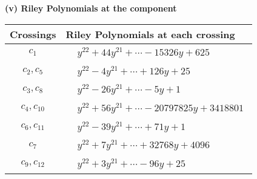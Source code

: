 \documentclass[1p]{elsarticle_modified}
\theoremstyle{definition}
\begin{document}
\flushleft \textbf{(v) Riley Polynomials at the component}\newline \\
\begin{tabular}{m{50pt}|m{274pt}}
Crossings & \hspace{64pt}Riley Polynomials at each crossing \\
\hline $$\begin{aligned}c_{1}\end{aligned}$$&$\begin{aligned}
&y^{22}+44 y^{21}+\cdots-15326 y+625
\end{aligned}$\\
\hline $$\begin{aligned}c_{2},c_{5}\end{aligned}$$&$\begin{aligned}
&y^{22}-4 y^{21}+\cdots+126 y+25
\end{aligned}$\\
\hline $$\begin{aligned}c_{3},c_{8}\end{aligned}$$&$\begin{aligned}
&y^{22}-26 y^{21}+\cdots-5 y+1
\end{aligned}$\\
\hline $$\begin{aligned}c_{4},c_{10}\end{aligned}$$&$\begin{aligned}
&y^{22}+56 y^{21}+\cdots-20797825 y+3418801
\end{aligned}$\\
\hline $$\begin{aligned}c_{6},c_{11}\end{aligned}$$&$\begin{aligned}
&y^{22}-39 y^{21}+\cdots+71 y+1
\end{aligned}$\\
\hline $$\begin{aligned}c_{7}\end{aligned}$$&$\begin{aligned}
&y^{22}+7 y^{21}+\cdots+32768 y+4096
\end{aligned}$\\
\hline $$\begin{aligned}c_{9},c_{12}\end{aligned}$$&$\begin{aligned}
&y^{22}+3 y^{21}+\cdots-96 y+25
\end{aligned}$\\
\hline
\end{tabular}\\~\\
\end{document}
